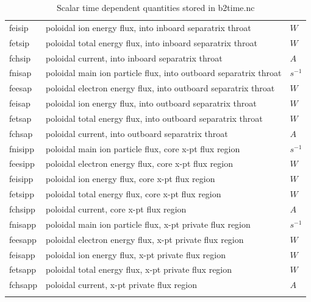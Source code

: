 \documentclass[a4paper,10pt]{report}
\begin{document}
\begin{center}
\begin{longtable}{|l|l|l|}
feisip \index{feisip}\index{b2time.nc, feisip} & poloidal ion energy flux, into inboard separatrix throat & $W $ \\
fetsip \index{fetsip}\index{b2time.nc, fetsip} & poloidal total energy flux, into inboard separatrix throat & $W $ \\
fchsip \index{fchsip}\index{b2time.nc, fchsip} & poloidal current, into inboard separatrix throat & $A $ \\
fnisap \index{fnisap}\index{b2time.nc, fnisap} & poloidal main ion particle flux, into outboard separatrix throat & $s^{-1}$ \\
feesap \index{feesap}\index{b2time.nc, feesap} & poloidal electron energy flux, into outboard separatrix throat & $W $ \\
feisap \index{feisap}\index{b2time.nc, feisap} & poloidal ion energy flux, into outboard separatrix throat & $W $ \\
fetsap \index{fetsap}\index{b2time.nc, fetsap} & poloidal total energy flux, into outboard separatrix throat & $W $ \\
fchsap \index{fchsap}\index{b2time.nc, fchsap} & poloidal current, into outboard separatrix throat & $A $ \\
fnisipp \index{fnisipp}\index{b2time.nc, fnisipp} & poloidal main ion particle flux, core x-pt flux region & $s^{-1}$ \\
feesipp \index{feesipp}\index{b2time.nc, feesipp} & poloidal electron energy flux, core x-pt flux region & $W $ \\
feisipp \index{feisipp}\index{b2time.nc, feisipp} & poloidal ion energy flux, core x-pt flux region & $W $ \\
fetsipp \index{fetsipp}\index{b2time.nc, fetsipp} & poloidal total energy flux, core x-pt flux region & $W $ \\
fchsipp \index{fchsipp}\index{b2time.nc, fchsipp} & poloidal current, core x-pt flux region & $A $ \\
fnisapp \index{fnisapp}\index{b2time.nc, fnisapp} & poloidal main ion particle flux, x-pt private flux region & $s^{-1}$ \\
feesapp \index{feesapp}\index{b2time.nc, feesapp} & poloidal electron energy flux, x-pt private flux region & $W $ \\
feisapp \index{feisapp}\index{b2time.nc, feisapp} & poloidal ion energy flux, x-pt private flux region & $W $ \\
fetsapp \index{fetsapp}\index{b2time.nc, fetsapp} & poloidal total energy flux, x-pt private flux region & $W $ \\
fchsapp \index{fchsapp}\index{b2time.nc, fchsapp} & poloidal current, x-pt private flux region & $A $ \\
    \hline
    \caption{Scalar time dependent quantities stored in b2time.nc}
    \label{tab:2db2time}
  \end{longtable}
\end{center}
\end{document}

